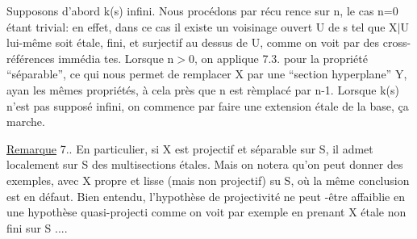 Supposons d'abord k(s) infini. Nous  procédons par récu%
rence sur n, le cas n=0 étant trivial: en effet, dans ce cas il existe
un voisinage ouvert U de s tel que X$|$U lui-même soit étale, fini, et
surjectif au dessus de U, comme on voit par des cross-références immédia
tes. Lorsque n$>$0, on applique 7.3. pour la propriété ``séparable'', ce qui
nous permet de  remplacer X par une ``section hyperplane'' Y, ayan
les mêmes propriétés, à cela près que n est rèmplacé par n-1. Lorsque
k(s) n'est pas supposé infini, on commence par faire une extension étale
de la base, ça marche.

\uline{Remarque} 7.. En particulier, si X est projectif et séparable sur S,
il admet localement sur S des multisections étales. Mais on notera qu'on
peut donner des exemples, avec X propre et lisse (mais non projectif) su
S, où la même conclusion est en défaut. Bien entendu, l'hypothèse de
 projectivité ne peut -être affaiblie  en une hypothèse quasi-projecti
comme on voit par exemple en prenant X étale non fini sur S ....


